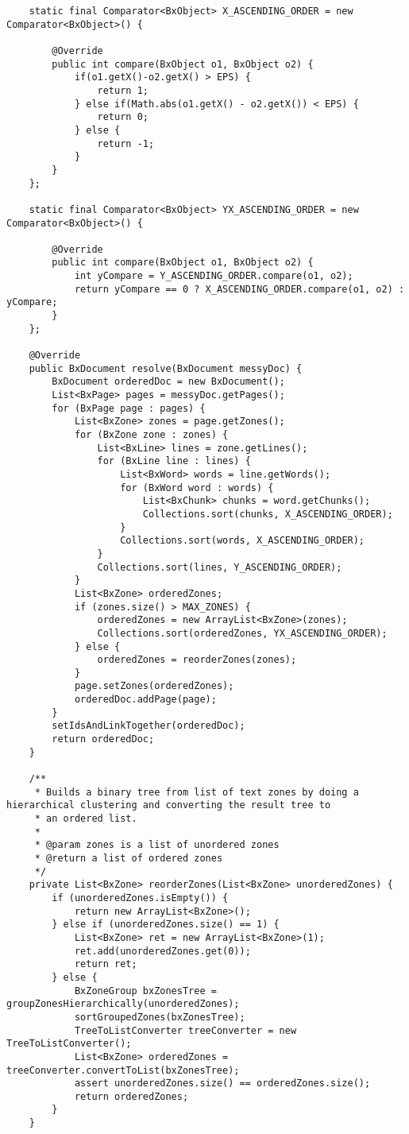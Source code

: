 \begin{appendices}
\begin{lstlisting}
    static final Comparator<BxObject> X_ASCENDING_ORDER = new Comparator<BxObject>() {

        @Override
        public int compare(BxObject o1, BxObject o2) {
        	if(o1.getX()-o2.getX() > EPS) {
        		return 1;
        	} else if(Math.abs(o1.getX() - o2.getX()) < EPS) {
        		return 0;
        	} else {
        		return -1;
        	}
        }
    };
    
    static final Comparator<BxObject> YX_ASCENDING_ORDER = new Comparator<BxObject>() {

        @Override
        public int compare(BxObject o1, BxObject o2) {
            int yCompare = Y_ASCENDING_ORDER.compare(o1, o2);
            return yCompare == 0 ? X_ASCENDING_ORDER.compare(o1, o2) : yCompare;
        }
    };

    @Override
    public BxDocument resolve(BxDocument messyDoc) {
        BxDocument orderedDoc = new BxDocument();
        List<BxPage> pages = messyDoc.getPages();
        for (BxPage page : pages) {
            List<BxZone> zones = page.getZones();
            for (BxZone zone : zones) {
                List<BxLine> lines = zone.getLines();
                for (BxLine line : lines) {
                    List<BxWord> words = line.getWords();
                    for (BxWord word : words) {
                        List<BxChunk> chunks = word.getChunks();
                        Collections.sort(chunks, X_ASCENDING_ORDER);
                    }
                    Collections.sort(words, X_ASCENDING_ORDER);
                }
                Collections.sort(lines, Y_ASCENDING_ORDER);
            }
            List<BxZone> orderedZones;
            if (zones.size() > MAX_ZONES) {
                orderedZones = new ArrayList<BxZone>(zones);
                Collections.sort(orderedZones, YX_ASCENDING_ORDER);
            } else {
                orderedZones = reorderZones(zones);
            }
            page.setZones(orderedZones);
            orderedDoc.addPage(page);
        }
        setIdsAndLinkTogether(orderedDoc);
        return orderedDoc;
    }

    /**
     * Builds a binary tree from list of text zones by doing a hierarchical clustering and converting the result tree to
     * an ordered list.
     *
     * @param zones is a list of unordered zones
     * @return a list of ordered zones
     */
    private List<BxZone> reorderZones(List<BxZone> unorderedZones) {
        if (unorderedZones.isEmpty()) {
            return new ArrayList<BxZone>();
        } else if (unorderedZones.size() == 1) {
            List<BxZone> ret = new ArrayList<BxZone>(1);
            ret.add(unorderedZones.get(0));
            return ret;
        } else {
            BxZoneGroup bxZonesTree = groupZonesHierarchically(unorderedZones);
            sortGroupedZones(bxZonesTree);
            TreeToListConverter treeConverter = new TreeToListConverter();
            List<BxZone> orderedZones = treeConverter.convertToList(bxZonesTree);
            assert unorderedZones.size() == orderedZones.size();
            return orderedZones;
        }
    }


\end{lstlisting}
\end{appendices}
